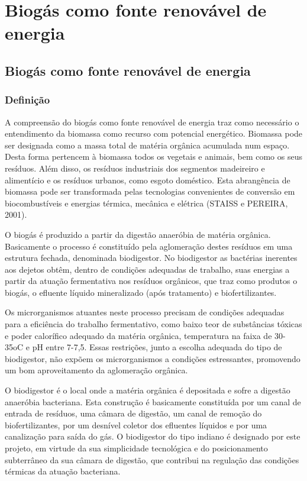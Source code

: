 \part{Biogás como fonte renovável de energia}
\chapter[Biogás como fonte renovável de energia]{Biogás como fonte renovável de energia}
\section {Definição}

A compreensão do biogás como fonte renovável de energia traz como necessário o entendimento da biomassa como recurso com potencial energético. Biomassa pode ser designada como a massa total de matéria orgânica acumulada num espaço. Desta forma pertencem à biomassa todos os vegetais e animais, bem como os seus resíduos. Além disso, os resíduos industriais dos segmentos madeireiro e alimentício e os resíduos urbanos, como esgoto doméstico. Esta abrangência de biomassa pode ser transformada pelas tecnologias convenientes de conversão em biocombustíveis e energias térmica, mecânica e elétrica (STAISS e PEREIRA, 2001).
\par O biogás é produzido a partir da digestão anaeróbia de matéria orgânica. Basicamente o processo é constituído pela aglomeração destes resíduos em uma estrutura fechada, denominada biodigestor. No biodigestor as bactérias inerentes aos dejetos obtêm, dentro de condições adequadas de trabalho, suas energias a partir da atuação fermentativa nos resíduos orgânicos, que traz como produtos o biogás, o efluente líquido mineralizado (após tratamento) e biofertilizantes.
\par Os microrganismos atuantes neste processo precisam de condições adequadas para a eficiência do trabalho fermentativo, como baixo teor de substâncias tóxicas e poder calorífico adequado da matéria orgânica, temperatura na faixa de 30-35oC e pH entre 7-7,5. Essas restrições, junto a escolha adequada do tipo de biodigestor, não expõem os microrganismos a condições estressantes, promovendo um bom aproveitamento da aglomeração orgânica.
\par O biodigestor é o local onde a matéria orgânica é depositada e sofre a digestão anaeróbia bacteriana. Esta construção é basicamente constituída por um canal de entrada de resíduos, uma câmara de digestão, um canal de remoção do biofertilizantes, por um desnível coletor dos efluentes líquidos e por uma canalização para saída do gás. O biodigestor do tipo indiano é designado por este projeto, em virtude da sua simplicidade tecnológica e do posicionamento subterrâneo da sua câmara de digestão, que contribui na regulação das condições térmicas da atuação bacteriana.

